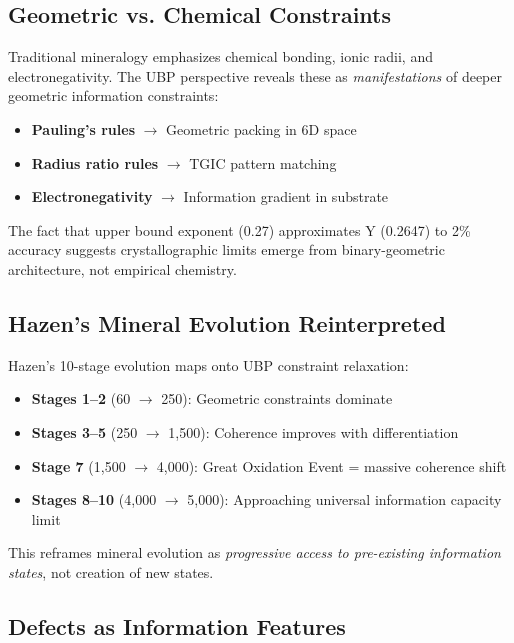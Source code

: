\documentclass[11pt,a4paper]{article}
\begin{document}
\subsection{Geometric vs. Chemical Constraints}

Traditional mineralogy emphasizes chemical bonding, ionic radii, and electronegativity. The UBP perspective reveals these as \textit{manifestations} of deeper geometric information constraints:

\begin{itemize}
\item \textbf{Pauling's rules} $\rightarrow$ Geometric packing in 6D space
\item \textbf{Radius ratio rules} $\rightarrow$ TGIC pattern matching
\item \textbf{Electronegativity} $\rightarrow$ Information gradient in substrate
\end{itemize}

The fact that upper bound exponent (0.27) approximates Y (0.2647) to 2\% accuracy suggests crystallographic limits emerge from binary-geometric architecture, not empirical chemistry.

\subsection{Hazen's Mineral Evolution Reinterpreted}

Hazen's 10-stage evolution\cite{hazen2008} maps onto UBP constraint relaxation:

\begin{itemize}
\item \textbf{Stages 1--2} (60 $\rightarrow$ 250): Geometric constraints dominate
\item \textbf{Stages 3--5} (250 $\rightarrow$ 1,500): Coherence improves with differentiation
\item \textbf{Stage 7} (1,500 $\rightarrow$ 4,000): Great Oxidation Event = massive coherence shift
\item \textbf{Stages 8--10} (4,000 $\rightarrow$ 5,000): Approaching universal information capacity limit
\end{itemize}

This reframes mineral evolution as \textit{progressive access to pre-existing information states}, not creation of new states.

\subsection{Defects as Information Features}
\end{document}
